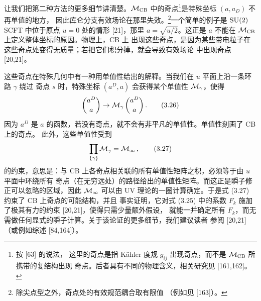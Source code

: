 
让我们把第二种方法的更多细节讲清楚。$\mathcal{M}_{\mathrm{CB}}$ 中的奇点\footnote{按 [63] 的说法，
这里的奇点是指 Kähler 度规 $g_{ij}$ 出现奇点，而不是 $\mathcal{M}_{\mathrm{CB}}$ 所携带的复结构出现
奇点。后者具有不同的物理含义，相关研究见 [161,162]。}是特殊坐标 $(a,a_D)$ 不再单值的地方，
因此库仑分支有效场论在那里失效。\footnote{除尖点型之外，奇点处的有效规范耦合取有限值
（例如见 [163]）。}一个简单的例子是 $\mathrm{SU}(2)$ SCFT 中位于原点 $u=0$ 处的情形 [21]，那里
$a=\sqrt{u/2}$。这正是 $a$ 不能在 $\mathcal{M}_{\mathrm{CB}}$ 上定义整体坐标的原因。物理上，CB 上
出现这些奇点，是因为某些带电粒子在这些奇点处变得无质量；若把它们积分掉，就会导致有效场论
中出现奇点 [20,21]。

这些奇点在特殊几何中有一种用单值性给出的解释。当我们在 $u$ 平面上沿一条环路 $\gamma$ 绕过
奇点 $s$ 时，特殊坐标 $(a^D,a)$ 会获得某个单值性 $\mathcal{M}_\gamma$，使得
\begin{equation}
  \begin{pmatrix} a^D\\[2pt] a\end{pmatrix}\to
  \mathcal{M}_\gamma\begin{pmatrix} a^D\\[2pt] a\end{pmatrix}.
  \tag{3.26}
\end{equation}
因为 $a^D$ 是 $a$ 的函数，若没有奇点，就不会有非平凡的单值性。单值性刻画了 CB 上的奇点。
此外，这些单值性受到
\begin{equation}
  \prod_{\{\gamma\}}\mathcal{M}_\gamma = \mathcal{M}_\infty\,,
  \tag{3.27}
\end{equation}
的约束，意思是：与 CB 上各奇点相关联的所有单值性矩阵之积，必须等于由 $u$ 平面中环绕所有
奇点（在无穷远处）的路径给出的单值性矩阵。而这正是瞬子修正可以忽略的区域，因此
$\mathcal{M}_\infty$ 可以由 UV 理论的一圈计算确定。于是式 (3.27) 约束了 CB 上奇点的可能结构，并且
事实证明，它对式 (3.25) 中的系数 $F_k$ 施加了极其有力的约束 [20,21]，使得只需少量额外假设，
就能一并确定所有 $F_k$，而无需做任何显式的瞬子计算。关于该论证的更多细节，我们建议读者
参阅 [20,21]（或例如综述 [84,164]）。




